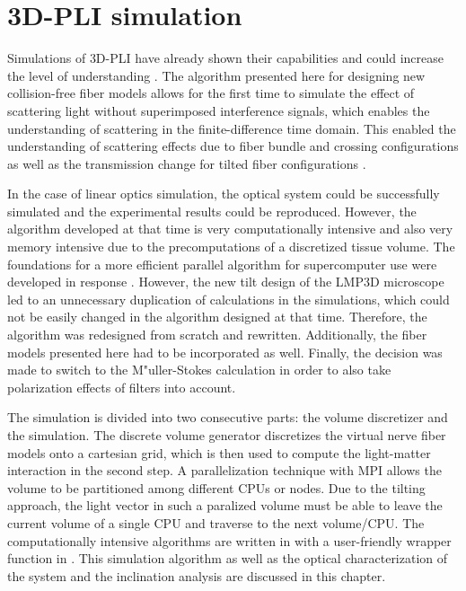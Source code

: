 \setcounter{chapter}{4}
\chapter{\acs{3D-PLI} simulation}
\label{cha:sof:simulation}
%
Simulations of \ac{3D-PLI} have already shown their capabilities and could increase the level of understanding \cite{Dohmen2015,Menzel2015,Menzel2016,Menzel2020,Menzel2021,MenzelMaster,MenzelDissertation}.
The algorithm presented here for designing new collision-free fiber models allows for the first time to simulate the effect of scattering light without superimposed interference signals, which enables the understanding of scattering in the finite-difference time domain.
This enabled the understanding of scattering effects due to fiber bundle and crossing configurations as well as the transmission change for tilted fiber configurations \cite{MenzelDissertation,Menzel2020,Menzel2021}.
\par
% 
In the case of linear optics simulation, the optical system could be successfully simulated and the experimental results \cite{Dohmen2015,Menzel2016} could be reproduced.
However, the algorithm developed at that time is very computationally intensive and also very memory intensive due to the precomputations of a discretized tissue volume.
The foundations for a more efficient parallel algorithm for supercomputer use were developed in response \cite{Lucksch2016}.
However, the new tilt design of the LMP3D microscope led to an unnecessary duplication of calculations in the simulations, which could not be easily changed in the algorithm designed at that time.
Therefore, the algorithm was redesigned from scratch and rewritten.
Additionally, the fiber models presented here had to be incorporated as well.
Finally, the decision was made to switch to the M"{u}ller-Stokes calculation in order to also take polarization effects of filters into account.
\par
%
The simulation is divided into two consecutive parts: the volume discretizer and the simulation.
The discrete volume generator discretizes the virtual nerve fiber models onto a cartesian grid, which is then used to compute the light-matter interaction in the second step.
A parallelization technique with \ac{MPI} allows the volume to be partitioned among different \acp{CPU} or nodes.
Due to the tilting approach, the light vector in such a paralized volume must be able to leave the current volume of a single \ac{CPU} and traverse to the next volume/\ac{CPU}.
The computationally intensive algorithms are written in \cpp{} with a user-friendly wrapper function in \python{}.
This simulation algorithm as well as the optical characterization of the system and the inclination analysis are discussed in this chapter.
%
% 
% 
